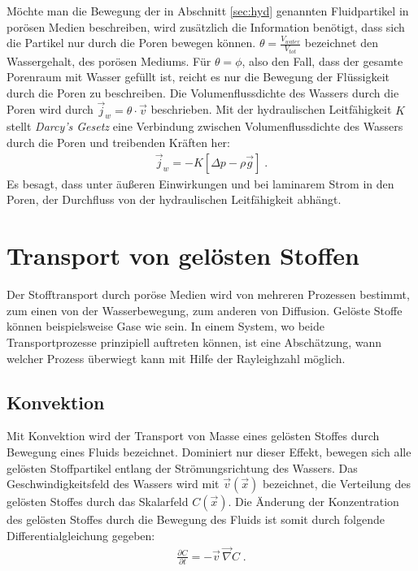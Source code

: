 Möchte man die Bewegung der in Abschnitt \ref{sec:hyd} genannten Fluidpartikel in porösen Medien beschreiben, wird zusätzlich die Information benötigt, dass sich die Partikel nur durch die Poren bewegen können.
\mbox{$\theta = \frac{V_{water}}{V_{tot}}$} bezeichnet den Wassergehalt, des porösen Mediums. Für $\theta = \phi$, also den Fall, dass der gesamte Porenraum mit Wasser gefüllt ist, reicht es nur die Bewegung der Flüssigkeit durch die Poren zu beschreiben. Die Volumenflussdichte des Wassers durch die Poren wird durch $\vec{j}_w = \theta \cdot \vec{v}$ beschrieben. 
Mit der hydraulischen Leitfähigkeit $K$ stellt \textit{Darcy's Gesetz} eine Verbindung zwischen Volumenflussdichte des Wassers durch die Poren und treibenden Kräften her:
\begin{align}
 \vec{j}_w = -K \left[ \Delta p - \rho \vec{g} \right] \; .
 \label{darcy}
\end{align}
Es besagt, dass unter äußeren Einwirkungen und bei laminarem Strom in den Poren, der Durchfluss von der hydraulischen Leitfähigkeit abhängt.

\section{Transport von gelösten Stoffen}
\label{sec:soltra}
Der Stofftransport durch poröse Medien wird von mehreren Prozessen bestimmt, zum einen von der Wasserbewegung, zum anderen von Diffusion.
Gelöste Stoffe können beispielsweise Gase wie \COT sein.
In einem System, wo beide Transportprozesse prinzipiell auftreten können, ist eine Abschätzung, wann welcher Prozess überwiegt kann mit Hilfe der Rayleighzahl möglich.

\subsection{Konvektion}
\label{sec:conv}
Mit Konvektion wird der Transport von Masse eines gelösten Stoffes durch Bewegung eines Fluids bezeichnet. Dominiert nur dieser Effekt, bewegen sich alle gelösten Stoffpartikel entlang der Strömungsrichtung des Wassers.
Das Geschwindigkeitsfeld des Wassers wird mit $\vec{v}(\vec{x})$ bezeichnet, die Verteilung des gelösten Stoffes durch das Skalarfeld $C(\vec{x})$. 
Die Änderung der Konzentration des gelösten Stoffes durch die Bewegung des Fluids ist somit durch folgende Differentialgleichung gegeben:
\begin{align}
 \frac{\partial C}{\partial t} = -\vec{v} \, \vec{\nabla}C \; .
 \label{eq:konv}
\end{align}


